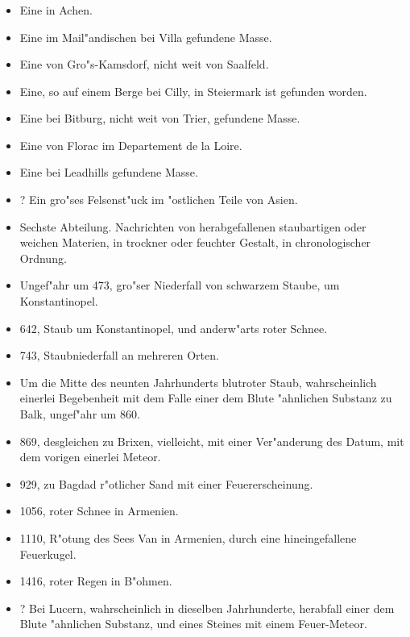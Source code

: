 \documentclass[a4paper, 11pt, oneside, polutonikogreek, german]{article}
\begin{document}
\subsubsection*{}
\begin{itemize}
    \item Eine in Achen.
    \item Eine im Mail"andischen bei Villa gefundene Masse.
    \item Eine von Gro"s-Kamsdorf, nicht weit von Saalfeld.
    \item Eine, so auf einem Berge bei Cilly, in Steiermark ist gefunden worden.
    \item Eine bei Bitburg, nicht weit von Trier, gefundene Masse.
    \item Eine von Florac im Departement de la Loire.
    \item Eine bei Leadhills gefundene Masse.
    \item ? Ein gro"ses Felsenst"uck im "ostlichen Teile von Asien.
    \item Sechste Abteilung. Nachrichten von herabgefallenen staubartigen oder weichen Materien, in trockner oder feuchter Gestalt, in chronologischer Ordnung.
    \item Ungef"ahr um 473, gro"ser Niederfall von schwarzem Staube, um Konstantinopel.
    \item 642, Staub um Konstantinopel, und anderw"arts roter Schnee.
    \item 743, Staubniederfall an mehreren Orten.
    \item Um die Mitte des neunten Jahrhunderts blutroter Staub, wahrscheinlich einerlei Begebenheit mit dem Falle einer dem Blute "ahnlichen Substanz zu Balk, ungef"ahr um 860.
    \item 869, desgleichen zu Brixen, vielleicht, mit einer Ver"anderung des Datum, mit dem vorigen einerlei Meteor.
    \item 929, zu Bagdad r"otlicher Sand mit einer Feuererscheinung.
    \item 1056, roter Schnee in Armenien.
    \item 1110, R"otung des Sees Van in Armenien, durch eine hineingefallene Feuerkugel.
    \item 1416, roter Regen in B"ohmen.
    \item ? Bei Lucern, wahrscheinlich in dieselben Jahrhunderte, herabfall einer dem Blute "ahnlichen Substanz, und eines Steines mit einem Feuer-Meteor.

\end{itemize}
\end{document}
